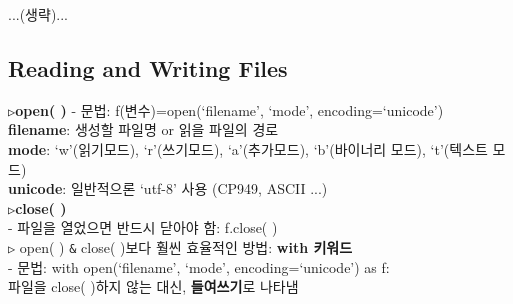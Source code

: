 \documentclass[11pt,a4paper]{article}
\begin{document}
...(생략)...

\subsection{\Large\textbf{Reading and Writing Files}}
\begin{spacing}{1.5}
\texttt{▷}\textbf{open( )}
- 문법: f(변수)=open(`filename', `mode', encoding=`unicode')\\
\hspace*{2em}\textbf{filename}: 생성할 파일명 or 읽을 파일의 경로\\
\hspace*{2em}\textbf{mode}: `w'(읽기모드), `r'(쓰기모드), `a'(추가모드), `b'(바이너리 모드), `t'(텍스트 모드)\\
\hspace*{2em}\textbf{unicode}: 일반적으론 `utf-8' 사용 (CP949, ASCII ...)\\
\texttt{▷}\textbf{close( )}\\
- 파일을 열었으면 반드시 닫아야 함: f.close( )\\

\texttt{▷} open( ) \verb|&| close( )보다 훨씬 효율적인 방법: \textbf{with 키워드}\\
- 문법: with open(`filename', `mode', encoding=`unicode') as f:\\
\hspace*{2em}파일을 close( )하지 않는 대신, \textbf{들여쓰기}로 나타냄
\end{spacing}\\
\end{document}
